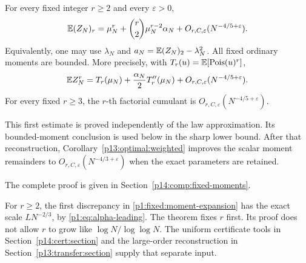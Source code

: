 \begin{theorem}
\label{p1:fixed:moments}
For every fixed integer \(r\ge2\) and every
\(\varepsilon>0\),
\begin{equation}
 \mathbb E(Z_N)_r
   =\mu_N^r+\binom r2\mu_N^{r-2}\alpha_N
       +O_{r,C,\varepsilon}(N^{-4/5+\varepsilon}).
 \label{p1:fixed:moment-expansion}
\end{equation}
Equivalently, one may use \(\lambda_N\) and
\(a_N=\mathbb E(Z_N)_2-\lambda_N^2\).
All fixed ordinary moments are bounded. More precisely,
with \(T_r(u)=\mathbb E[\operatorname{Pois}(u)^r]\),
\begin{equation}
 \mathbb E Z_N^r
    =T_r(\mu_N)+\frac{\alpha_N}{2}T_r''(\mu_N)
       +O_{r,C,\varepsilon}(N^{-4/5+\varepsilon}).
 \label{p1:fixed:ordinary}
\end{equation}
For every fixed \(r\ge3\), the \(r\)-th factorial
cumulant is \(O_{r,C,\varepsilon}(N^{-4/5+\varepsilon})\).
\end{theorem}

This first estimate is proved independently of the law approximation.
Its bounded-moment conclusion is used below in the sharp lower bound.
After that reconstruction, Corollary~\ref{p13:optimal:weighted}
improves the scalar moment remainders to
\(O_{r,C,\varepsilon}(N^{-4/3+\varepsilon})\) when the exact
parameters are retained.

\noindent The complete proof is given in Section~\ref{p14:comp:fixed-moments}.


For \(r\ge2\), the first discrepancy in
\eqref{p1:fixed:moment-expansion} has the exact scale
\(L N^{-2/3}\), by \eqref{p1:eq:alpha-leading}.
The theorem fixes \(r\) first. Its proof does not
allow \(r\) to grow like \(\log N/\log\log N\).
The uniform certificate tools in Section~\ref{p14:cert:section} and the
large-order reconstruction in Section~\ref{p13:transfer:section}
supply that separate input.

